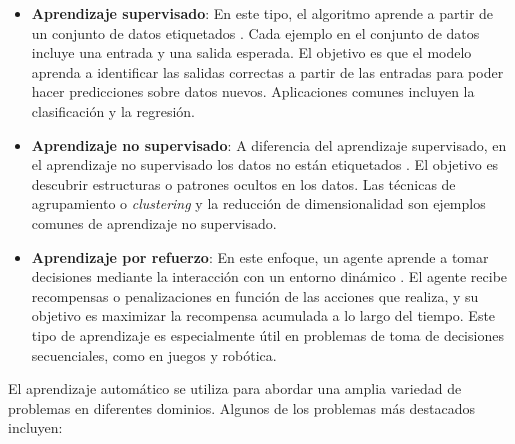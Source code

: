 \begin{itemize}
	\item \textbf{Aprendizaje supervisado}: En este tipo, el algoritmo aprende a
	partir de un conjunto de datos etiquetados \cite{abu2012learning}. Cada ejemplo
	en el conjunto de datos incluye una entrada y una salida esperada. El
	objetivo es que el modelo aprenda a identificar las salidas correctas a
	partir de las entradas para poder hacer predicciones sobre datos nuevos. Aplicaciones
	comunes incluyen la clasificación y la regresión.
	
	\item \textbf{Aprendizaje no supervisado}: A diferencia del aprendizaje supervisado,
	en el aprendizaje no supervisado los datos no están etiquetados
	\cite{ghahramani2003unsupervised}. El objetivo es descubrir estructuras o patrones
	ocultos en los datos. Las técnicas de agrupamiento o \textit{clustering} y la
	reducción de dimensionalidad son ejemplos comunes de aprendizaje no supervisado.
	
	\item \textbf{Aprendizaje por refuerzo}: En este enfoque, un agente aprende a
	tomar decisiones mediante la interacción con un entorno dinámico
	\cite{sutton2018reinforcement}. El agente recibe recompensas o penalizaciones
	en función de las acciones que realiza, y su objetivo es maximizar la
	recompensa acumulada a lo largo del tiempo. Este tipo de aprendizaje es especialmente
	útil en problemas de toma de decisiones secuenciales, como en juegos y
	robótica.
\end{itemize}

El aprendizaje automático se utiliza para abordar una amplia variedad de problemas
en diferentes dominios. Algunos de los problemas más destacados incluyen:

